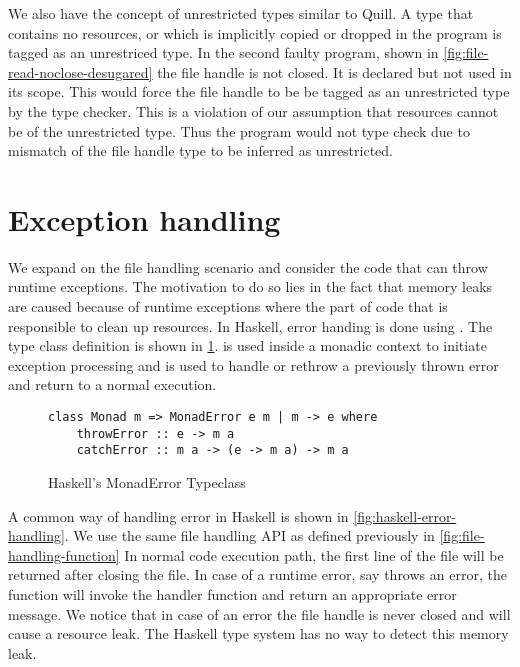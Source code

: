 We also have the concept of unrestricted types similar to Quill. A type that contains no resources, or which is implicitly
copied or dropped in the program is tagged as an unrestriced type. In the second faulty program,
shown in \cref{fig:file-read-noclose-desugared} the file handle  is not closed.
It is declared but not used in its scope. This would force the file handle to be be tagged as an unrestricted type by the \qub{} type checker.
This is a violation of our assumption that resources cannot be of the unrestricted type. Thus
the program would not type check due to mismatch of the file handle type to be inferred as unrestricted.

\section{Exception handling}
We expand on the file handling scenario and consider the code that can throw runtime exceptions.
The motivation to do so lies in the fact that memory leaks are caused because of runtime
exceptions where the part of code that is responsible to clean up resources. In Haskell, error handing is done using \citep{liang_monad_1995}.
The type class definition is shown in \cref{fig:haskell-monaderror}.  is used inside a monadic context to initiate
exception processing and  is used to handle or rethrow a previously thrown error and return
to a normal execution.

\begin{figure}[h]
  \begin{framed}
\begin{verbatim}
class Monad m => MonadError e m | m -> e where
    throwError :: e -> m a
    catchError :: m a -> (e -> m a) -> m a
\end{verbatim}
  \end{framed}
  \caption{Haskell's MonadError Typeclass}
  \label{fig:haskell-monaderror}
\end{figure}

\noindent
A common way of handling error in Haskell is shown in \cref{fig:haskell-error-handling}.
We use the same file handling API as defined previously in \cref{fig:file-handling-function}
In normal code execution path, the first line of the file will be returned after closing the file.
In case of a runtime error, say  throws an error, the  function will
invoke the handler function and return an appropriate error message. We notice that in case of an error the file handle 
is never closed and will cause a resource leak. The Haskell type system has no way to detect this memory leak.

